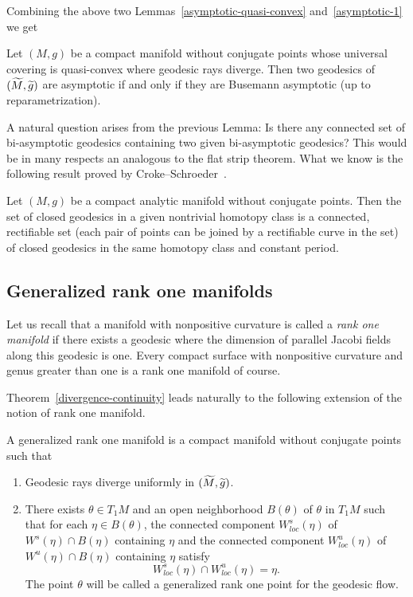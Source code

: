 \documentclass[AHL,Unicode,longabstracts,published]{cedram}
\let\oldtilde\tilde
\renewcommand*{\tilde}[1]{\mathchoice{\widetilde{#1}}{\widetilde{#1}}{\oldtilde{#1}}{\oldtilde{#1}}}
\begin{document}
\pagebreak
Combining the above two Lemmas~\ref{asymptotic-quasi-convex} and~\ref{asymptotic-1} we get

\begin{coro}\label{asympt-unique}
Let $(M,g)$ be a compact manifold without conjugate points whose universal covering is quasi-convex where geodesic rays diverge. Then two geodesics of $(\tilde{M}, \tilde{g})$ are asymptotic if and only if they are Busemann asymptotic (up to reparametrization).
\end{coro}

A natural question arises from the previous Lemma: Is there any connected set of bi-asymptotic geodesics containing two given bi-asymptotic geodesics? This would be in many respects an analogous to the flat strip theorem. What we know is the following result proved by Croke--Schroeder~\cite{kn:CS}.

\begin{theo}\label{CS}
Let $(M,g)$ be a compact analytic manifold without conjugate points. Then the set of closed geodesics in a given nontrivial homotopy class is a connected, rectifiable set (each pair of points can be joined by a rectifiable curve in the set) of closed geodesics in the same homotopy class and constant period.
\end{theo}

\subsection{Generalized rank one manifolds}

Let us recall that a manifold with nonpositive curvature is called a \emph{rank one manifold} if there exists a geodesic where the dimension of parallel Jacobi fields along this geodesic is one. Every compact surface with nonpositive curvature and genus greater than one is a rank one manifold of course.

Theorem~\ref{divergence-continuity} leads naturally to the following extension of the notion of rank one manifold.

\begin{defi}\label{DEFgenrankone}
A generalized rank one manifold is a compact manifold without conjugate points such that
\begin{enumerate}
\item  \label{defi2.13.1}Geodesic rays diverge uniformly in $(\tilde{M}, \tilde{g})$.
\item \label{defi2.13.2}There exists $\theta \in T_{1}M$ and an open neighborhood $B(\theta)$ of $\theta$ in $T_1M$ such that for each $\eta \in B(\theta)$, the connected component $W^{s}_{loc}(\eta)$ of $W^{s}(\eta) \cap B(\eta)$ containing $\eta$ and the connected component $W^{u}_{loc}(\eta)$ of $W^{u}(\eta) \cap B(\eta)$ containing $\eta$ satisfy
\[
W^{s}_{loc}(\eta) \cap W^{u}_{loc}(\eta) = \eta.
\]
The point $\theta$ will be called a generalized rank one point for the geodesic flow.
\end{enumerate}
\end{defi}
\end{document}
